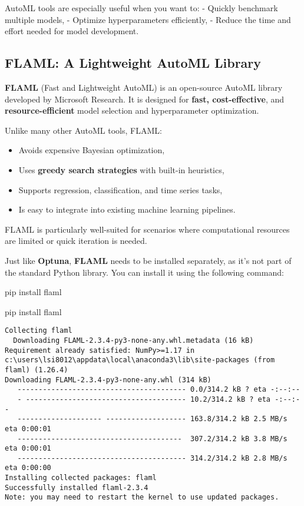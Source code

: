 \documentclass[
  letterpaper,
  DIV=11,
  numbers=noendperiod]{scrreprt}
\newenvironment{Shaded}{\begin{snugshade}}{\end{snugshade}}
\newcommand{\NormalTok}[1]{\textcolor[rgb]{0.00,0.23,0.31}{#1}}
\providecommand{\tightlist}{%
  \setlength{\itemsep}{0pt}\setlength{\parskip}{0pt}}\usepackage{longtable,booktabs,array}
\begin{document}
AutoML tools are especially useful when you want to: - Quickly benchmark
multiple models, - Optimize hyperparameters efficiently, - Reduce the
time and effort needed for model development.

\subsection{FLAML: A Lightweight AutoML
Library}\label{flaml-a-lightweight-automl-library}

\textbf{FLAML} (Fast and Lightweight AutoML) is an open-source AutoML
library developed by Microsoft Research. It is designed for
\textbf{fast, cost-effective}, and \textbf{resource-efficient} model
selection and hyperparameter optimization.

Unlike many other AutoML tools, FLAML:

\begin{itemize}
\tightlist
\item
  Avoids expensive Bayesian optimization,
\item
  Uses \textbf{greedy search strategies} with built-in heuristics,
\item
  Supports regression, classification, and time series tasks,
\item
  Is easy to integrate into existing machine learning pipelines.
\end{itemize}

FLAML is particularly well-suited for scenarios where computational
resources are limited or quick iteration is needed.

Just like \textbf{Optuna}, \textbf{FLAML} needs to be installed
separately, as it's not part of the standard Python library. You can
install it using the following command:

\begin{Shaded}
\begin{Highlighting}[]
\NormalTok{pip install flaml}
\end{Highlighting}
\end{Shaded}

\begin{Shaded}
\begin{Highlighting}[]
\NormalTok{pip install flaml}
\end{Highlighting}
\end{Shaded}

\begin{verbatim}
Collecting flaml
  Downloading FLAML-2.3.4-py3-none-any.whl.metadata (16 kB)
Requirement already satisfied: NumPy>=1.17 in c:\users\lsi8012\appdata\local\anaconda3\lib\site-packages (from flaml) (1.26.4)
Downloading FLAML-2.3.4-py3-none-any.whl (314 kB)
   ---------------------------------------- 0.0/314.2 kB ? eta -:--:--
   - -------------------------------------- 10.2/314.2 kB ? eta -:--:--
   -------------------- ------------------- 163.8/314.2 kB 2.5 MB/s eta 0:00:01
   ---------------------------------------  307.2/314.2 kB 3.8 MB/s eta 0:00:01
   ---------------------------------------- 314.2/314.2 kB 2.8 MB/s eta 0:00:00
Installing collected packages: flaml
Successfully installed flaml-2.3.4
Note: you may need to restart the kernel to use updated packages.
\end{verbatim}
\end{document}
